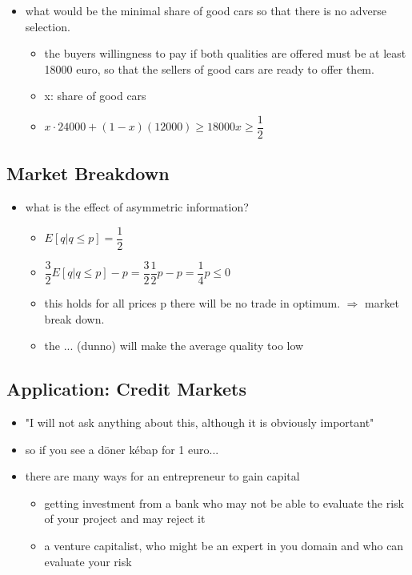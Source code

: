 \documentclass[12pt, a4paper, titlepage]{extarticle}
\begin{document}
\begin{itemize}
    \item what would be the minimal share of good cars so that there is no adverse selection.
        \begin{itemize}
        \item the buyers willingness to pay if both qualities are offered must be at least 18000 euro, so that the sellers of good cars are ready to offer them.
        \item x: share of good cars
        \item $x\cdot 24000 + (1-x)(12000) \geq 18000 x \geq \dfrac{1}{2}$
        \end{itemize}
    \end{itemize}
    
    \subsection{Market Breakdown}

    \begin{itemize}
    \item what is the effect of asymmetric information?
        \begin{itemize}
        \item $E[q|q\leq p]= \dfrac{1}{2}$
        \item $\dfrac{3}{2} E[q|q\leq p] -p = \dfrac{3}{2}\dfrac{1}{2} p-p = \dfrac{1}{4}p\leq 0$
        \item this holds for all prices p there will be no trade in optimum. $\Rightarrow$ market break
        down.
        
        \item the ... (dunno) will make the average quality too low

        \end{itemize}
    \end{itemize}
    
    \subsection{Application: Credit Markets}
        \begin{itemize}
            \item "I will not ask anything about this, although it is obviously important"
            \item so if you see a döner kébap for 1 euro...
            \item there are many ways for an entrepreneur to gain capital
            \begin{itemize}
                \item getting investment from a bank who may not be able to evaluate the risk of your project and may reject it
                \item a venture capitalist, who might be an expert in you domain and who can evaluate your risk
            \end{itemize}
        
        \end{itemize}
\end{document}
